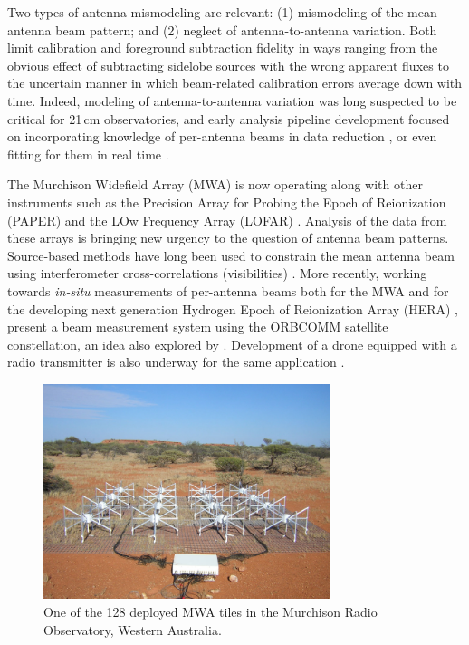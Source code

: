 Two types of antenna mismodeling are relevant: (1) mismodeling of the mean antenna beam pattern; and (2) neglect of antenna-to-antenna variation. Both limit calibration and foreground subtraction fidelity in ways ranging from the obvious effect of subtracting sidelobe sources with the wrong apparent fluxes to the uncertain manner in which beam-related calibration errors average down with time. Indeed, modeling of antenna-to-antenna variation was long suspected to be critical for 21\,cm observatories, and early analysis pipeline development focused on incorporating knowledge of per-antenna beams in data reduction \citep{moralesandmatejek,fhd}, or even fitting for them in real time \citep{mwarts}.

The Murchison Widefield Array (MWA) \citep{lonsdale09,tingay13,mwascience} is now operating along with other instruments such as the Precision Array for Probing the Epoch of Reionization (PAPER) \citep{paperinstrument, parsons14} and the LOw Frequency Array (LOFAR) \citep{lofar}. Analysis of the data from these arrays is bringing new urgency to the question of antenna beam patterns. Source-based methods have long been used to constrain the mean antenna beam using interferometer cross-correlations (visibilities) \citep[e.g.,][]{pober12, lofar,colegate14}. More recently, working towards \textit{in-situ} measurements of per-antenna beams both for the MWA and for the developing next generation Hydrogen Epoch of Reionization Array (HERA) \citep{PoberNextGen,Whitepaper5}, \citet{neben15} present a beam measurement system using the ORBCOMM satellite constellation, an idea also explored by \citep{zheng14}. Development of a  drone equipped with a radio transmitter is also underway for the same application \citep{drone1,drone2}. 


\begin{figure}
\includegraphics[width=8.38cm]{chap2_beamforming_errors/tile_photo.pdf}
\caption[A deployed MWA tile in the Murchison Radio Observatory.]{One of the 128 deployed MWA tiles in the Murchison Radio Observatory, Western Australia.}
\label{fig:tilephoto}
\end{figure}

